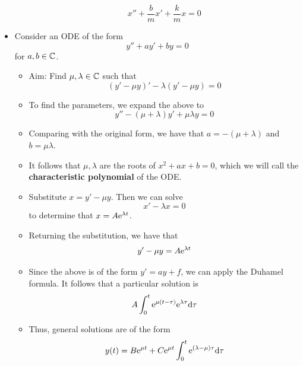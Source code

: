 \documentclass[../notes.tex]{subfiles}
\begin{document}
\begin{itemize}
\begin{itemize}
        \begin{equation*}
            x''+\frac{b}{m}x'+\frac{k}{m}x = 0
        \end{equation*}
    \end{itemize}
    \item Consider an ODE of the form
    \begin{equation*}
        y''+ay'+by = 0
    \end{equation*}
    for $a,b\in\C$.
    \begin{itemize}
        \item Aim: Find $\mu,\lambda\in\C$ such that
        \begin{equation*}
            (y'-\mu y)'-\lambda(y'-\mu y) = 0
        \end{equation*}
        \item To find the parameters, we expand the above to
        \begin{equation*}
            y''-(\mu+\lambda)y'+\mu\lambda y = 0
        \end{equation*}
        \item Comparing with the original form, we have that $a=-(\mu+\lambda)$ and $b=\mu\lambda$.
        \item It follows that $\mu,\lambda$ are the roots of $x^2+ax+b=0$, which we will call the \textbf{characteristic polynomial} of the ODE.
        \item Substitute $x=y'-\mu y$. Then we can solve
        \begin{equation*}
            x'-\lambda x = 0
        \end{equation*}
        to determine that $x=A\e[\lambda t]$.
        \item Returning the substitution, we have that
        \begin{equation*}
            y'-\mu y = A\e[\lambda t]
        \end{equation*}
        \item Since the above is of the form $y'=ay+f$, we can apply the Duhamel formula. It follows that a particular solution is
        \begin{equation*}
            A\int_0^t\e[\mu(t-\tau)]\e[\lambda\tau]\dd\tau
        \end{equation*}
        \item Thus, general solutions are of the form
        \begin{equation*}
            y(t) = B\e[\mu t]+C\e[\mu t]\int_0^t\e[(\lambda-\mu)\tau]\dd\tau
        \end{equation*}

\end{itemize}
\end{itemize}
\end{document}
